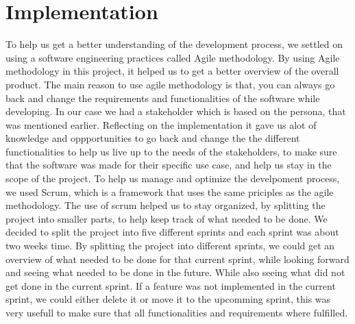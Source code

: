 \section{Implementation}
To help us get a better understanding of the development process, we settled on using a software engineering practices called Agile methodology. By using Agile methodology in this project, it helped us to get a better overview of the overall product. The main reason to use agile methodology is that, you can always go back and change the requirements and functionalities of the software while developing. 
In our case we had a stakeholder which is based on the persona, that was mentioned earlier. \newline 
Reflecting on the implementation it gave us alot of knowledge and oppportunities to go back and change the the different functionalities to help us live up to the needs of the stakeholders, to make sure that the software was made for their specific use case, and help us stay in the scope of the project. \newline
To help us manage and optimize the develpoment process, we used Scrum, which is a framework that uses the same priciples as the agile methodology. The use of scrum helped us to stay organized, by splitting the project into smaller parts, to help keep track of what needed to be done.
We decided to split the project into five different sprints and each sprint was about two weeks time. By splitting the project into different sprints, we could get an overview of what needed to be done for that current sprint, while looking forward and seeing what needed to be done in the future. 
While also seeing what did not get done in the current sprint. If a feature was not implemented in the current sprint, we could either delete it or move it to the upcomming sprint, this was very usefull to make sure that all functionalities and requirements where fulfilled.

